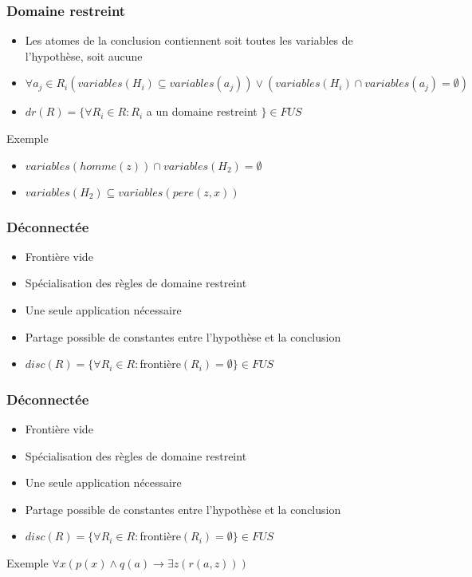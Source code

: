 \begin{frame}
	\frametitle{Domaine restreint}
	\begin{itemize}
		\item Les atomes de la conclusion contiennent soit toutes les variables de
		l'hypothèse, soit aucune
		\item $\forall a_j \in R_i (variables(H_i) \subseteq variables(a_j)) \vee 
		(variables(H_i) \cap variables(a_j) = \emptyset)$
		\item $dr(R) = \{\forall R_i \in R : R_i$ a un domaine restreint $\} \in FUS$
	\end{itemize}
	\vspace{10mm}
	\begin{exampleblock}{Exemple}
		\begin{itemize}
			\item $variables(homme(z)) \cap variables(H_2) = \emptyset$
			\item $variables(H_2) \subseteq variables(pere(z,x))$
		\end{itemize}
	\end{exampleblock}
\end{frame}

\begin{frame}
	\frametitle{Déconnectée}
	\begin{itemize}
		\item Frontière vide
		\item Spécialisation des règles de domaine restreint
		\item Une seule application nécessaire
		\item Partage possible de constantes entre l'hypothèse et la conclusion
		\item $disc(R) = \{\forall R_i \in R : $frontière$(R_i) = \emptyset \} \in FUS$
	\end{itemize}
	\vspace{10mm}
\end{frame}

\begin{frame}
	\frametitle{Déconnectée}
	\begin{itemize}
		\item Frontière vide
		\item Spécialisation des règles de domaine restreint
		\item Une seule application nécessaire
		\item Partage possible de constantes entre l'hypothèse et la conclusion
		\item $disc(R) = \{\forall R_i \in R : $frontière$(R_i) = \emptyset \} \in FUS$
	\end{itemize}
	\vspace{10mm}
	\begin{exampleblock}{Exemple}
		$\forall x (p(x) \wedge q(a) \rightarrow \exists z (r(a,z)))$
	\end{exampleblock}
\end{frame}

